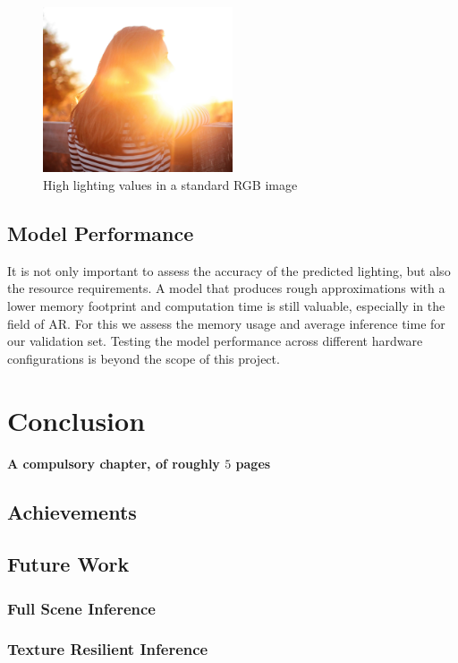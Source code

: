 \documentclass[ %
                    author={Gavin Parker},
                supervisor={Dr. Neill Campbell},
                    degree={MEng},
                     title={Deep Siamese Networks for Illumination Estimation from Stereo Images},
                  subtitle={},
                      type={research},
                      year={2018} ]{dissertation}
\begin{document}
\begin{figure}[h]
\centering
\includegraphics[width=0.5\textwidth]{exposure_example}
\caption{High lighting values in a standard RGB image}
\label{rgb_example}
\end{figure}

\section{Model Performance}
It is not only important to assess the accuracy of the predicted lighting, but also the resource requirements. A model that produces rough approximations with a lower memory footprint and computation time is still valuable, especially in the field of AR. For this we assess the memory usage and average inference time for our validation set. Testing the model performance across different hardware configurations is beyond the scope of this project.

\chapter{Conclusion}
\label{chap:conclusion}

{\bf A compulsory chapter,     of roughly $5$ pages} 
\vspace{1cm} 

\noindent
\section{Achievements}
\section{Future Work}
\subsection{Full Scene Inference}
\subsection{Texture Resilient Inference}
\end{document}
